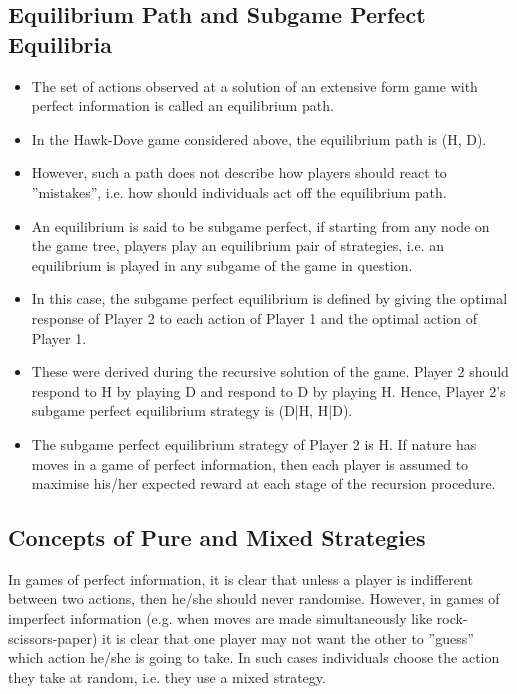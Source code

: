 \documentclass[]{report}
\begin{document}
\subsection{Equilibrium Path and Subgame Perfect Equilibria}
\begin{itemize}
\item The set of actions observed at a solution of an extensive form
	game with perfect information is called an equilibrium path.
\item In the Hawk-Dove game considered above, the equilibrium path is
	(H, D).
\item However, such a path does not describe how players should react to
	”mistakes”, i.e. how should individuals act off the equilibrium path.
\item An equilibrium is said to be subgame perfect, if starting from any
	node on the game tree, players play an equilibrium pair of
	strategies, i.e. an equilibrium is played in any subgame of the game
	in question.
\end{itemize}


\begin{itemize}
\item In this case, the subgame perfect equilibrium is defined by giving
the optimal response of Player 2 to each action of Player 1 and the
optimal action of Player 1.
\item These were derived during the recursive solution of the game.
Player 2 should respond to H by playing D and respond to D by
playing H. Hence, Player 2’s subgame perfect equilibrium strategy
is (D|H, H|D).
\item The subgame perfect equilibrium strategy of Player 2 is H.
If nature has moves in a game of perfect information, then each
player is assumed to maximise his/her expected reward at each
stage of the recursion procedure.

\end{itemize}

\subsection{Concepts of Pure and Mixed Strategies}
In games of perfect information, it is clear that unless a player is
indifferent between two actions, then he/she should never
randomise.
However, in games of imperfect information (e.g. when moves are
made simultaneously like rock-scissors-paper) it is clear that one
player may not want the other to ”guess” which action he/she is
going to take.
In such cases individuals choose the action they take at random,
i.e. they use a mixed strategy.
\end{document}

